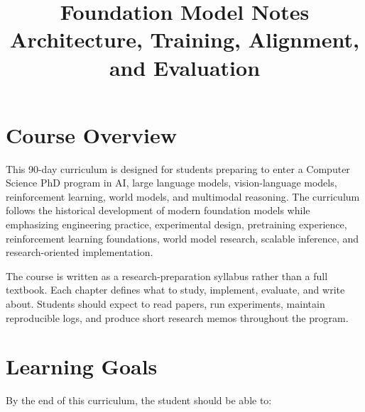 \documentclass[11pt]{article}
\title{Foundation Model Notes\\[0.3em]\large Architecture, Training, Alignment, and Evaluation}
\author{}
\date{}
\begin{document}
\maketitle

\section*{Course Overview}

This 90-day curriculum is designed for students preparing to enter a Computer Science PhD program in AI, large language models, vision-language models, reinforcement learning, world models, and multimodal reasoning. The curriculum follows the historical development of modern foundation models while emphasizing engineering practice, experimental design, pretraining experience, reinforcement learning foundations, world model research, scalable inference, and research-oriented implementation.

The course is written as a research-preparation syllabus rather than a full textbook. Each chapter defines what to study, implement, evaluate, and write about. Students should expect to read papers, run experiments, maintain reproducible logs, and produce short research memos throughout the program.

\section*{Learning Goals}

By the end of this curriculum, the student should be able to:
\end{document}
